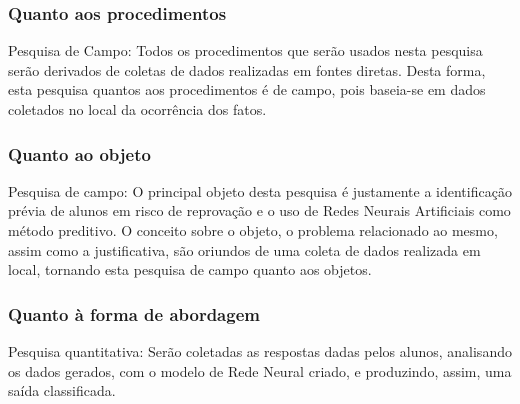 \subsubsection{Quanto aos procedimentos}
Pesquisa de Campo: Todos os procedimentos que serão usados nesta pesquisa serão derivados de coletas de dados realizadas em fontes diretas. Desta forma, esta pesquisa quantos aos procedimentos é de campo, pois baseia-se em dados coletados no local da ocorrência dos fatos.

\subsubsection{Quanto ao objeto}
Pesquisa de campo: O principal objeto desta pesquisa é justamente a identificação prévia de alunos em risco de reprovação e o uso de Redes Neurais Artificiais como método preditivo. O conceito sobre o objeto, o problema relacionado ao mesmo, assim como a justificativa, são oriundos de uma coleta de dados realizada em local, tornando esta pesquisa de campo quanto aos objetos.

\subsubsection{Quanto à forma de abordagem}
Pesquisa quantitativa: Serão coletadas as respostas dadas pelos alunos, analisando os dados gerados, com o modelo de Rede Neural criado, e produzindo, assim, uma saída classificada.